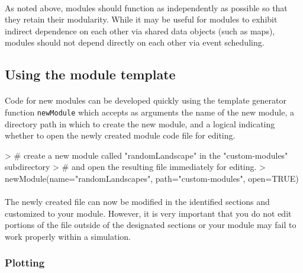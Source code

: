 \documentclass{article}
\begin{document}
\paragraph{}
\textit{\color{blue}{perhaps a bit about design phlosophy, relating back to dependencies and how to carefully build modules that actually retain modularity.}}

\paragraph{}
As noted above, modules should function as independently as possible so that they retain their modularity. While it may be useful for modules to exhibit indirect dependence on each other via shared data objects (such as maps), modules should not depend directly on each other via event scheduling.

\subsection{Using the module template}

\paragraph{}
Code for new modules can be developed quickly using the template generator function \texttt{newModule} which accepts as arguments the name of the new module, a directory path in which to create the new module, and a logical indicating whether to open the newly created module code file for editing.

\begin{Schunk}
\begin{Sinput}
> # create a new module called "randomLandscape" in the "custom-modules" subdirectory
> # and open the resulting file immediately for editing.
> newModule(name="randomLandscapes", path="custom-modules", open=TRUE)
\end{Sinput}
\end{Schunk}

\paragraph{}
The newly created file can now be modified in the identified sections and customized to your module. However, it is very important that you do not edit portions of the file outside of the designated sections or your module may fail to work properly within a simulation.

\subsubsection{Plotting}
\end{document}
